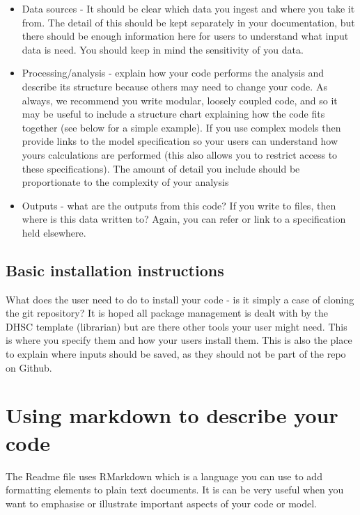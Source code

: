 \documentclass[
  letterpaper,
]{book}
\begin{document}
\begin{itemize}
\item
  Data sources - It should be clear which data you ingest and where you
  take it from. The detail of this should be kept separately in your
  documentation, but there should be enough information here for users
  to understand what input data is need. You should keep in mind the
  sensitivity of you data.
\item
  Processing/analysis - explain how your code performs the analysis and
  describe its structure because others may need to change your code. As
  always, we recommend you write modular, loosely coupled code, and so
  it may be useful to include a structure chart explaining how the code
  fits together (see below for a simple example). If you use complex
  models then provide links to the model specification so your users can
  understand how yours calculations are performed (this also allows you
  to restrict access to these specifications). The amount of detail you
  include should be proportionate to the complexity of your analysis
\item
  Outputs - what are the outputs from this code? If you write to files,
  then where is this data written to? Again, you can refer or link to a
  specification held elsewhere.
\end{itemize}

\hypertarget{basic-installation-instructions}{%
\subsection{Basic installation
instructions}\label{basic-installation-instructions}}

What does the user need to do to install your code - is it simply a case
of cloning the git repository? It is hoped all package management is
dealt with by the DHSC template (librarian) but are there other tools
your user might need. This is where you specify them and how your users
install them. This is also the place to explain where inputs should be
saved, as they should not be part of the repo on Github.

\hypertarget{using-markdown-to-describe-your-code}{%
\section{Using markdown to describe your
code}\label{using-markdown-to-describe-your-code}}

The Readme file uses RMarkdown which is a language you can use to add
formatting elements to plain text documents. It is can be very useful
when you want to emphasise or illustrate important aspects of your code
or model.
\end{document}
